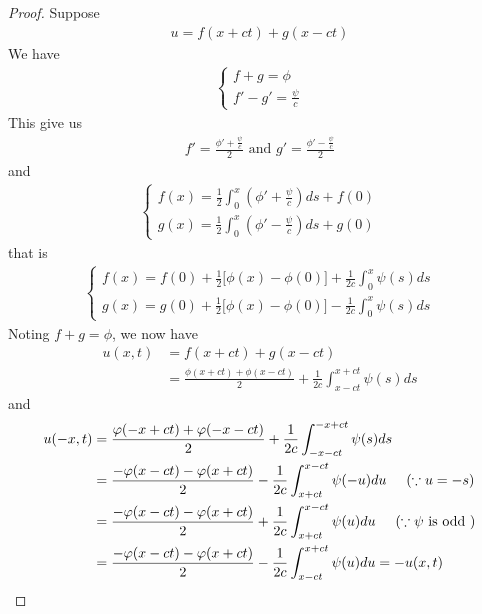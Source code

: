 \documentclass{report}
\begin{document}
\begin{proof}
Suppose 
\begin{align*}
u=f(x+ct)+g(x-ct)
\end{align*}
We have  
\begin{align*}
\begin{cases}
  f+g=\phi \\
  f'-g'= \frac{\psi }{c}
\end{cases}
\end{align*}
This give us 
\begin{align*}
f'= \frac{\phi ' + \frac{\psi}{c}}{2}\text{ and }g'= \frac{\phi' - \frac{\psi}{c}}{2}
\end{align*}
and 
\begin{align*}
\begin{cases}
f(x)= \frac{1}{2}\int_0^x (\phi' + \frac{\psi}{c})ds +f(0)\\
g(x)= \frac{1}{2}\int_0^x (\phi' - \frac{\psi}{c})ds +g(0)
\end{cases}
\end{align*}
that is 
\begin{align*}
\begin{cases}
  f(x)=f(0)+ \frac{1}{2}\Big[\phi (x)-\phi (0) \Big]+ \frac{1}{2c}\int_0^x \psi (s)ds \\
  g(x)=g(0)+ \frac{1}{2}\Big[ \phi (x)- \phi (0) \Big]- \frac{1}{2c}\int_0^x \psi (s)ds
\end{cases}
\end{align*}
Noting $f+g=\phi$, we now have 
\begin{align*}
u(x,t)&=f(x+ct)+g(x-ct) \\
&=\frac{\phi (x+ct)+ \phi (x-ct)}{2}+ \frac{1}{2c}\int^{x+ct}_{x-ct}\psi (s)ds
\end{align*}
and 
\begin{align*}
u(-x,t)&=\frac{\phi (-x+ct)+ \phi (-x-ct)}{2} + \frac{1}{2c}\int^{-x+ct}_{-x-ct}\psi (s)ds \\
&= \frac{-\phi (x-ct)-\phi (x+ct)}{2} -\frac{1}{2c}\int_{x+ct}^{x-ct}\psi (-u)du \hspace{0.5cm}(\because u=-s)\\
&=\frac{-\phi (x-ct)-\phi (x+ct)}{2} +\frac{1}{2c}\int_{x+ct}^{x-ct}\psi (u)du \hspace{0.5cm}(\because \psi\text{ is odd }) \\
&=\frac{-\phi (x-ct)-\phi (x+ct)}{2} -\frac{1}{2c}\int^{x+ct}_{x-ct}\psi (u)du = -u(x,t)
\end{align*}
\end{proof}
\end{document}

